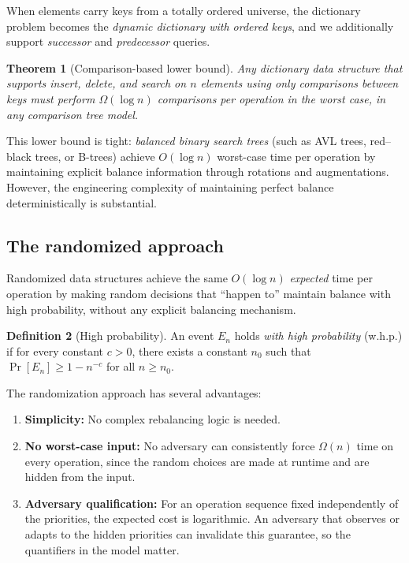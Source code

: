 \documentclass[twoside,12pt]{book}
\theoremstyle{plain}
\newtheorem{theorem}{Theorem}[chapter]
\theoremstyle{definition}
\newtheorem{definition}[theorem]{Definition}
\theoremstyle{remark}
\begin{document}
When elements carry keys from a totally ordered universe, the dictionary problem becomes the \emph{dynamic dictionary with ordered keys}, and we additionally support \emph{successor} and \emph{predecessor} queries.

\begin{theorem}[Comparison-based lower bound]
Any dictionary data structure that supports insert, delete, and search on $n$ elements using only comparisons between keys must perform $\Omega(\log n)$ comparisons per operation in the worst case, in any comparison tree model.
\end{theorem}

This lower bound is tight: \emph{balanced binary search trees} (such as AVL trees, red--black trees, or B-trees) achieve $O(\log n)$ worst-case time per operation by maintaining explicit balance information through rotations and augmentations. However, the engineering complexity of maintaining perfect balance deterministically is substantial.

\subsection{The randomized approach}

Randomized data structures achieve the same $O(\log n)$ \emph{expected} time per operation by making random decisions that ``happen to'' maintain balance with high probability, without any explicit balancing mechanism.

\begin{definition}[High probability]
An event $E_n$ holds \emph{with high probability} (w.h.p.) if for every constant $c > 0$, there exists a constant $n_0$ such that $\Pr[E_n] \geq 1 - n^{-c}$ for all $n \geq n_0$.
\end{definition}

The randomization approach has several advantages:
\begin{enumerate}[nosep]
    \item \textbf{Simplicity:} No complex rebalancing logic is needed.
    \item \textbf{No worst-case input:} No adversary can consistently force $\Omega(n)$ time on every operation, since the random choices are made at runtime and are hidden from the input.
    \item \textbf{Adversary qualification:} For an operation sequence fixed independently of the priorities, the expected cost is logarithmic. An adversary that observes or adapts to the hidden priorities can invalidate this guarantee, so the quantifiers in the model matter.
\end{enumerate}
\end{document}
